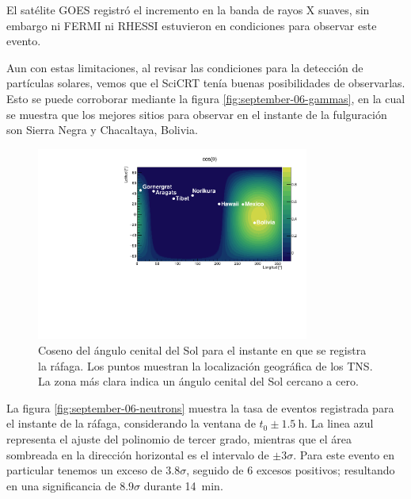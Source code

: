 El satélite GOES registró el incremento en la banda de rayos X suaves, sin embargo ni FERMI ni RHESSI estuvieron en condiciones para observar este evento.

Aun con estas limitaciones, al revisar las condiciones para la detección de partículas solares, vemos que el SciCRT tenía buenas posibilidades de observarlas. Esto se puede corroborar mediante la figura \ref{fig:september-06-gammas}, en la cual se muestra que los mejores sitios para observar en el instante de la fulguración son Sierra Negra y Chacaltaya, Bolivia.

\begin{figure}
        \centering
        \includegraphics[width=0.8\textwidth]{cosz_170906.pdf}
        \caption{Coseno del ángulo cenital del Sol para el instante en que se registra la ráfaga. Los puntos muestran la localización geográfica de los TNS. La zona más clara indica un ángulo cenital del Sol cercano a cero.}
        \label{fig:september-06-zenith}
\end{figure}

La figura \ref{fig:september-06-neutrons} muestra la tasa de eventos registrada para el instante de la ráfaga, considerando la ventana de $t_{0}\pm\SI{1.5}{\hour}$. La linea azul representa el ajuste del polinomio de tercer grado, mientras que el área sombreada en la dirección horizontal es el intervalo de $\pm 3\sigma$. Para este evento en particular tenemos un exceso de $3.8\sigma$, seguido de \num{6} excesos positivos; resultando en una significancia de $8.9\sigma$ durante \SI{14}{\minute}.

